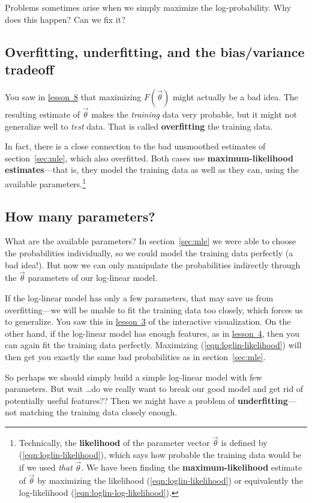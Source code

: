 \documentclass[11pt]{article}
\newcommand{\vtheta}{\vec{\theta}}
\newcommand{\lesson}[1]{\href{http://cs.jhu.edu/~jason/tutorials/loglin/\##1}{lesson~#1}}
\begin{document}
Problems sometimes arise when we simply maximize the log-probability.
Why does this happen?  Can we fix it?

\subsection{Overfitting, underfitting, and the bias/variance tradeoff}

You saw in \lesson{8} that maximizing $F(\vtheta)$ might actually be a
bad idea.  The resulting estimate of $\vtheta$ makes the {\em
  training} data very probable, but it might not generalize well to
{\em test} data.  That is called {\bf overfitting} the training data.

In fact, there is a close connection to the bad unsmoothed estimates
of section~\ref{sec:mle}, which also overfitted.  Both cases use {\bf
  maximum-likelihood estimates}---that is, they model the training
data as well as they can, using the available
parameters.\footnote{Technically, the {\bf likelihood} of the
  parameter vector $\vtheta$ is defined by
  (\ref{eqn:loglin-likelihood}), which says how probable the training
  data would be if we used {\em that} $\vtheta$.  We have been finding
  the {\bf maximum-likelihood} estimate of $\vtheta$ by maximizing the
  likelihood (\ref{eqn:loglin-likelihood}) or equivalently the
  log-likelihood (\ref{eqn:loglin-log-likelihood}).}

\subsection{How many parameters?}

What are the available parameters?  In section~\ref{sec:mle} we were
able to choose the probabilities individually, so we could model the
training data perfectly (a bad idea!).  But now we can only manipulate
the probabilities indirectly through the $\vtheta$ parameters of our
log-linear model.

If the log-linear model has only a few parameters, that may save us
from overfitting---we will be unable to fit the training data too
closely, which forces us to generalize.  You saw this in \lesson{3} of
the interactive visualization.  On the other hand, if the log-linear
model has enough features, as in \lesson{4}, then you can again fit the
training data perfectly.  Maximizing (\ref{eqn:loglin-likelihood})
will then get you exactly the same bad probabilities as in
section~\ref{sec:mle}.

So perhaps we should simply build a simple log-linear model with few
parameters.  But wait \ldots do we really want to break our good model
and get rid of potentially useful features??  Then we might have a
problem of {\bf underfitting}---not matching the training data closely
enough.
\end{document}
